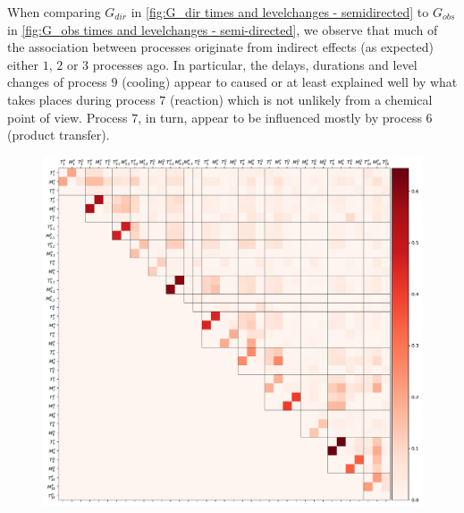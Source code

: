 \documentclass[../Thesis.tex]{subfiles}
\begin{document}
When comparing $G_{dir}$ in \autoref{fig:G_dir times and levelchanges - semidirected} to $G_{obs}$ in \autoref{fig:G_obs times and levelchanges - semi-directed}, we observe that much of the association between processes originate from indirect effects (as expected) either $1$, $2$ or $3$ processes ago. In particular, the delays, durations and level changes of process $9$ (cooling) appear to caused or at least explained well by what takes places during process $7$ (reaction) which is not unlikely from a chemical point of view. Process $7$, in turn, appear to be influenced mostly by process $6$ (product transfer).
\begin{figure}[ht]
    \centering
    \includegraphics[width = \linewidth]{figures/Cycle data/G_dir times and levelchanges - semi-directed.pdf}
    \caption{}
    \label{fig:G_dir times and levelchanges - semidirected}
\end{figure}
\end{document}
